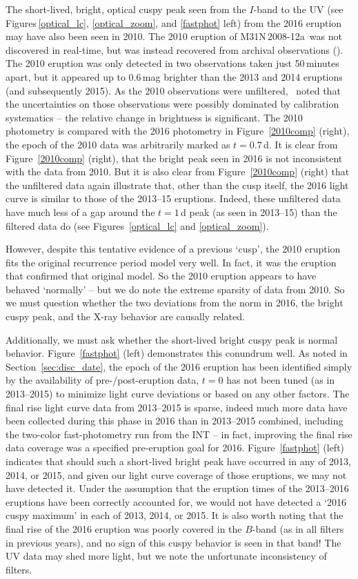 \documentclass[twocolumn,tighten]{aastex6}
\def\novak{{M31N\,2008-12a}}
\newcommand{\halfk}{\citetalias{2015A&A...582L...8H}}
\begin{document}
The short-lived, bright, optical cuspy peak seen from the $I$-band to the UV (see Figures\,\ref{optical_lc}, \ref{optical_zoom}, and \ref{fastphot} left) from the 2016 eruption may have also been seen in 2010.  The 2010 eruption of \novak\ was not discovered in real-time, but was instead recovered from archival observations (\halfk).  The 2010 eruption was only detected in two observations taken just 50\,minutes apart, but it appeared up to 0.6\,mag brighter than the 2013 and 2014 eruptions (and subsequently 2015).  As the 2010 observations were unfiltered, \halfk\ noted that the uncertainties on those observations were possibly dominated by calibration systematics -- the relative change in brightness is significant.  The 2010 photometry is compared with the 2016 photometry in Figure~\ref{2010comp} (right), the epoch of the 2010 data was arbitrarily marked as $t=0.7$\,d.  It is clear from Figure~\ref{2010comp} (right), that the bright peak seen in 2016 is not inconsistent with the data from 2010.  But it is also clear from Figure~\ref{2010comp} (right) that the unfiltered data again illustrate that, other than the cusp itself, the 2016 light curve is similar to those of the 2013--15 eruptions.  Indeed, these unfiltered data have much less of a gap around the $t=1$\,d peak (as seen in 2013--15) than the filtered data do (see Figures~\ref{optical_lc} and \ref{optical_zoom}). 

However, despite this tentative evidence of a previous `cusp', the 2010 eruption fits the original recurrence period model very well.  In fact, it was the eruption that confirmed that original model.  So the 2010 eruption appears to have behaved `normally' -- but we do note the extreme sparsity of data from 2010.  So we must question whether the two deviations from the norm in 2016, the bright cuspy peak, and the X-ray behavior are causally related.

Additionally, we must ask whether the short-lived bright cuspy peak is normal behavior.  Figure~\ref{fastphot} (left) demonstrates this conundrum well.  As noted in Section~\ref{sec:disc_date}, the epoch of the 2016 eruption has been identified simply by the availability of pre-/post-eruption data, $t=0$ has not been tuned (as in 2013--2015) to minimize light curve deviations or based on any other factors.  The final rise light curve data from 2013--2015 is sparse, indeed much more data have been collected during this phase in 2016 than in 2013--2015 combined, including the two-color fast-photometry run from the INT -- in fact, improving the final rise data coverage was a specified pre-eruption goal for 2016.  Figure~\ref{fastphot} (left) indicates that should such a short-lived bright peak have occurred in any of 2013, 2014, or 2015, and given our light curve coverage of those eruptions, we may not have detected it.  Under the assumption that the eruption times of the 2013--2016 eruptions have been correctly accounted for, we would not have detected a `2016 cuspy maximum' in each of 2013, 2014, or 2015.  It is also worth noting that the final rise of the 2016 eruption was poorly covered in the $B$-band (as in all filters in previous years), and no sign of this cuspy behavior is seen in that band!  The UV data may shed more light, but we note the unfortunate inconsistency of filters.  
\end{document}
